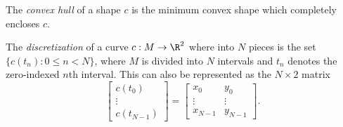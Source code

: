 \documentclass[12pt]{article}
\begin{document}
\begin{defn}
    The \emph{convex hull} of a shape $c$ is the minimum convex shape which completely encloses $c$.
\end{defn}

\begin{defn}
    The \emph{discretization} of a curve $c: M \to \R^2$ where into $N$ pieces is the set $\{c(t_n) : 0 \leq n < N\}$, where $M$ is divided into $N$ intervals and $t_n$ denotes the zero-indexed $n$th interval. This can also be represented as the $N \times 2$ matrix
    \[\begin{bmatrix}
        c(t_0) \\ \vdots \\ c(t_{N-1})
    \end{bmatrix} = \begin{bmatrix}
        x_0 & y_0 \\ \vdots & \vdots \\ x_{N-1} & y_{N-1}
    \end{bmatrix}.\]
\end{defn}
\end{document}
